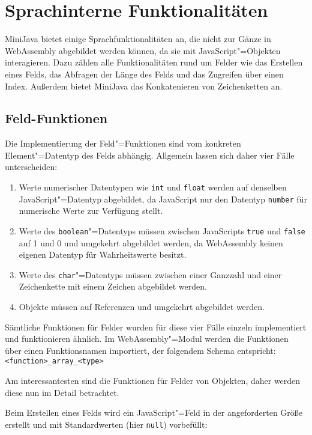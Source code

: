 \section{Sprachinterne Funktionalitäten}
\label{sec:Sprachinterne-Funktionalitäten}

MiniJava bietet einige Sprachfunktionalitäten an, die nicht zur Gänze in WebAssembly abgebildet werden können, da sie mit JavaScript"=Objekten interagieren. Dazu zählen alle Funktionalitäten rund um Felder wie das Erstellen eines Felds, das Abfragen der Länge des Felds und das Zugreifen über einen Index. Außerdem bietet MiniJava das Konkatenieren von Zeichenketten an.

\subsection{Feld-Funktionen}
\label{subsec:Feld-Funktionen}

Die Implementierung der Feld"=Funktionen sind vom konkreten Element"=Datentyp des Felds abhängig. Allgemein lassen sich daher vier Fälle unterscheiden:

\begin{enumerate}
    \item Werte numerischer Datentypen wie \lstinline{int} und \lstinline{float} werden auf denselben JavaScript"=Datentyp abgebildet, da JavaScript nur den Datentyp \lstinline{number} für numerische Werte zur Verfügung stellt.
    \item Werte des \lstinline{boolean}"=Datentyps müssen zwischen JavaScripts \lstinline{true} und \lstinline{false} auf 1 und 0 und umgekehrt abgebildet werden, da WebAssembly keinen eigenen Datentyp für Wahrheitswerte besitzt.
    \item Werte des \lstinline{char}"=Datentyps müssen zwischen einer Ganzzahl und einer Zeichenkette mit einem Zeichen abgebildet werden.
    \item Objekte  müssen auf Referenzen und umgekehrt abgebildet werden. 
\end{enumerate}

Sämtliche Funktionen für Felder wurden für diese vier Fälle einzeln implementiert und funktionieren ähnlich. Im WebAssembly"=Modul werden die Funktionen über einen Funktionsnamen importiert, der folgendem Schema entspricht: \lstinline{<function>_array_<type>}

Am interessantesten sind die Funktionen für Felder von Objekten, daher werden diese nun im Detail betrachtet.

Beim Erstellen eines Felds wird ein JavaScript"=Feld in der angeforderten Größe erstellt und mit Standardwerten (hier \lstinline{null}) vorbefüllt:


